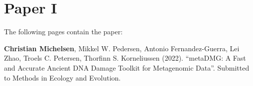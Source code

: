 \chapter{Paper I}
\label{chapter:metadmg}

The following  pages contain the paper:

\vspace*{1cm}


\textbf{Christian Michelsen}, Mikkel W. Pedersen, Antonio Fernandez-Guerra, Lei Zhao, Troels C. Petersen, Thorfinn S. Korneliussen (2022). ``metaDMG: A Fast and Accurate Ancient DNA Damage Toolkit for Metagenomic Data''. Submitted to Methods in Ecology and Evolution.

\clearpage



